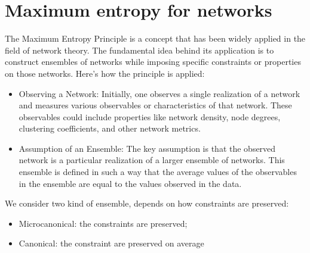 \section{Maximum entropy for networks}
The Maximum Entropy Principle is a concept that has been widely applied in the field of network theory. The fundamental idea behind its application is to construct ensembles of networks while imposing specific constraints or properties on those networks.
Here's how the principle is applied:
\begin{itemize}
\item Observing a Network: Initially, one observes a single realization of a network and measures various observables or characteristics of that network. These observables could include properties like network density, node degrees, clustering coefficients, and other network metrics.

\item Assumption of an Ensemble: The key assumption is that the observed network is a particular realization of a larger ensemble of networks. This ensemble is defined in such a way that the average values of the observables in the ensemble are equal to the values observed in the data.
\end{itemize}
We consider two kind of ensemble, depends on how constraints are preserved:
\begin{itemize}
	\item Microcanonical: the constraints are preserved;
	\item Canonical: the constraint are preserved on average
\end{itemize}
